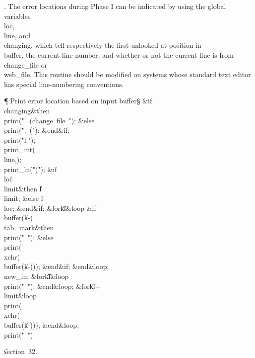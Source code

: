 . The error locations during Phase I can be indicated by using the global
variables \\{loc}, \\{line}, and \\{changing}, which tell respectively the
first
unlooked-at position in \\{buffer}, the current line number, and whether or not
the current line is from \\{change\_file} or \\{web\_file}.
This routine should be modified on systems whose standard text editor
has special line-numbering conventions.

\Y\P\?\4:Print error location based on input buffer\X\S\?\6
\&{if}\1\1\8\\{changing}\2\8\&{then}\6
\\{print}\?\1(\?\.{".\ (change\ file\ "}\?\2)\?;\6
\4\&{else}\6
\\{print}\?\1(\?\.{".\ ("}\?\2)\?;\2\6
\&{end}\8\2\&{if}\1;\6
\\{print}\?\1(\?\.{"l."}\?\2)\?;\5
\\{print\_int}\?\1(\?\\{line}\?,\?\2)\?;\5
\\{print\_ln}\?\1(\?\.{")"}\?\2)\?;\6
\&{if}\1\1\8\\{loc}\?\G\?\\{limit}\2\8\&{then}\6
\|l\?\K\?\\{limit};\6
\4\&{else}\6
\|l\?\K\?\\{loc};\2\6
\&{end}\8\2\&{if}\1;\6
\1\&{for}\8\|k\?\in{}\?\to\?\|l\8\&{loop}\6
\&{if}\1\1\8\\{buffer}\?\1(\?\|k\?-\?\2)=\?\\{tab\_mark}\2\8\&{then}\6
\\{print}\?\1(\?\.{"\ "}\?\2)\?;\6
\4\&{else}\6
\\{print}\?\1(\?\\{xchr}\?\1(\?\\{buffer}\?\1(\?\|k\?-\?\2)\2)\2)\?;\2\6
\&{end}\8\2\&{if}\1;\2\6
\&{end}\8\&{loop};\6
\\{new\_ln};\6
\1\&{for}\8\|k\?\in{}\?\to\?\|l\8\&{loop}\6
\\{print}\?\1(\?\.{"\ "}\?\2)\?;\2\6
\&{end}\8\&{loop};\6
\1\&{for}\8\|k\?\in\?\|l\?+\?\to\?\\{limit}\8\&{loop}\6
\\{print}\?\1(\?\\{xchr}\?\1(\?\\{buffer}\?\1(\?\|k\?-\?\2)\2)\2)\?;\2\6
\&{end}\8\&{loop};\6
\\{print}\?\1(\?\.{"\ "}\?\2)\?\par
\U section~32.\fi

